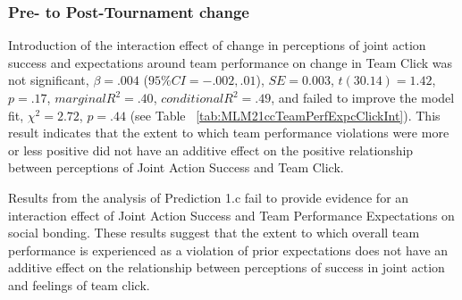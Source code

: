 \begin{landscape}
  \subsubsection{Pre- to Post-Tournament change}
  Introduction of the interaction effect of change in perceptions of joint action success and expectations around team performance on change in Team Click was not significant, $\beta = .004$ ($95\% CI =  -.002, .01$), $SE = 0.003$, $t(30.14) = 1.42$, $p = .17$, $marginal R^2 = .40$, $conditional R^2 = .49$, and failed to improve the model fit, $\chi^2 = 2.72$, $ p = .44$ (see Table ~\ref{tab:MLM21ccTeamPerfExpcClickInt}).  This result indicates that the extent to which team performance violations were more or less positive did not have an additive effect on the positive relationship between perceptions of Joint Action Success and Team Click.

  


Results from the analysis of Prediction 1.c fail to provide evidence for an interaction effect of Joint Action Success and Team Performance Expectations on social bonding.  These results suggest that the extent to which overall team performance is experienced as a violation of prior expectations does not have an additive effect on the relationship between perceptions of success in joint action and feelings of team click.


















\end{landscape}
